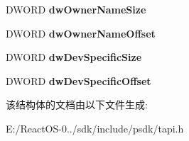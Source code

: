 \begin{DoxyCompactItemize}
\item 
\mbox{\label{structphonestatus__tag_a4fd0cea5af97342eda5e956156bc3e1d}} 
D\+W\+O\+RD {\bfseries dw\+Owner\+Name\+Size}
\item 
\mbox{\label{structphonestatus__tag_a89b08a444ffbb9e18b04eddf0c8f404c}} 
D\+W\+O\+RD {\bfseries dw\+Owner\+Name\+Offset}
\item 
\mbox{\label{structphonestatus__tag_a2e46d9bebcc7318925af5a88d709dc59}} 
D\+W\+O\+RD {\bfseries dw\+Dev\+Specific\+Size}
\item 
\mbox{\label{structphonestatus__tag_a1ab79d07da3c4155b2b98118644b8aaa}} 
D\+W\+O\+RD {\bfseries dw\+Dev\+Specific\+Offset}
\end{DoxyCompactItemize}


该结构体的文档由以下文件生成\+:\begin{DoxyCompactItemize}
\item 
E\+:/\+React\+O\+S-\/0../sdk/include/psdk/tapi.\+h\end{DoxyCompactItemize}
